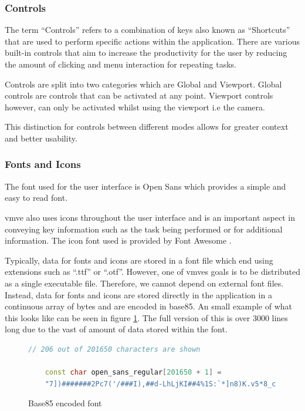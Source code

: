 \documentclass[11pt]{article}
\begin{document}
\subsubsection{Controls}
The term ``Controls'' refers to a combination of keys also known as
``Shortcuts'' that are used to perform specific actions within the application.
There are various  built-in controls that aim to increase the productivity for
the user by reducing the amount of clicking and menu interaction for repeating tasks.

Controls are split into two categories which are Global and Viewport. Global controls
are controls that can be activated at any point. Viewport controls however, can only 
be activated whilst using the viewport i.e the camera.

This distinction for controls between different modes allows for greater context and
better usability. 






\subsubsection{Fonts and Icons}
The font used for the user interface is Open Sans which provides a simple and
easy to read font.

\gls{vmve} also uses icons throughout the user interface and is an important
aspect in conveying key information such as the task being performed or for
additional information. The icon font used is provided by Font Awesome
\cite{font-awesome}.

Typically, data for fonts and icons are stored in a font file which end using
extensions such as ``.ttf'' or ``.otf''. However, one of \glspl{vmve} goals is
to be distributed as a single executable file. Therefore, we cannot depend on
external font files. Instead, data for fonts and icons are stored directly in
the application in a continuous array of bytes and are encoded in base85. An
small example of what this looks like can be seen in figure
\ref{fig:base85_font}. The full version of this is over 3000 lines long due to
the vast of amount of data stored within the font.

\begin{figure}[h!]
  \centering
  \begin{lstlisting}[language=C++]
    // 206 out of 201650 characters are shown

    const char open_sans_regular[201650 + 1] =
    "7])#######2Pc7('/###I),##d-LhLjKI##4%1S:`*]n8)K.v5*8_c)iZ;99=$$$$c(m]4pKdp/(RdL<snZo'oI,hLNDnx4Uu/>8Q7oo^eFb3hB4JYc'Tx-3l_wgd2Tf._r+&sAqV,-G"":F8LD=5,n]A&aA+<gXG-<iobW&>$>QJ8Z.W$jg0Fv-o^(^JJnf4T"
  \end{lstlisting}
  \caption{Base85 encoded font}
  \label{fig:base85_font}
\end{figure}
\end{document}
